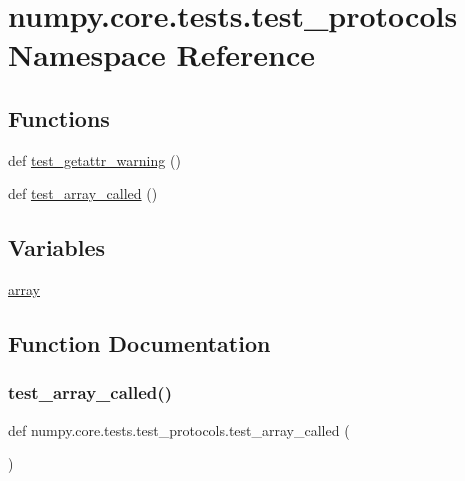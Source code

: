 \hypertarget{namespacenumpy_1_1core_1_1tests_1_1test__protocols}{}\section{numpy.\+core.\+tests.\+test\+\_\+protocols Namespace Reference}
\label{namespacenumpy_1_1core_1_1tests_1_1test__protocols}
\subsection*{Functions}
\begin{DoxyCompactItemize}
\item 
def \hyperlink{namespacenumpy_1_1core_1_1tests_1_1test__protocols_a1112e5fe84142461caee99adf6e21a1b}{test\+\_\+getattr\+\_\+warning} ()
\item 
def \hyperlink{namespacenumpy_1_1core_1_1tests_1_1test__protocols_a2968f45bd2254ccfc85543e8b88fc7f9}{test\+\_\+array\+\_\+called} ()
\end{DoxyCompactItemize}
\subsection*{Variables}
\begin{DoxyCompactItemize}
\item 
\hyperlink{namespacenumpy_1_1core_1_1tests_1_1test__protocols_a3940b88b0b3a48c925daf27ccc88f558}{array}
\end{DoxyCompactItemize}


\subsection{Function Documentation}
\mbox{\label{namespacenumpy_1_1core_1_1tests_1_1test__protocols_a2968f45bd2254ccfc85543e8b88fc7f9}} 
\subsubsection{\texorpdfstring{test\+\_\+array\+\_\+called()}{test\_array\_called()}}
{\footnotesize\ttfamily def numpy.\+core.\+tests.\+test\+\_\+protocols.\+test\+\_\+array\+\_\+called (\begin{DoxyParamCaption}{ }\end{DoxyParamCaption})}

